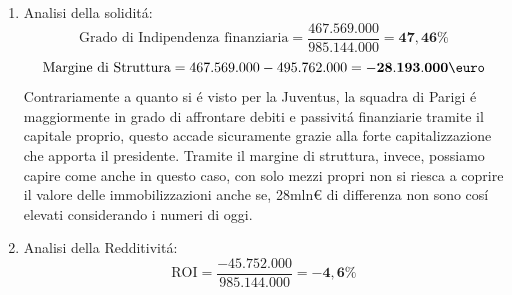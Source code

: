 \documentclass[
    corpo=12pt,
    oneside,
    evenboxes,
    tipotesi=triennale,
    stile=classica,
    oldstyle,
    autoretitolo,
    greek,
]{toptesi}
\begin{document}
\begin{interlinea}{1.5}
\begin{enumerate}
\begin{figure}
            \label{sp_psg}  
        \end{figure}
        \begin{equation}
                \text{Margine di Tesoreria} = 74.346.000-246.032.000 = \mathbf{-171.786.000\mbox{\euro}}
            \label{eqn: marg_teso_psg}
        \end{equation}
        \begin{equation}
                \text{Indice di liquidit\'a primaria} = \frac{74.346.000}{246.032.000} = \mathbf{30,21\%}
            \label{eqn: ind_liq_psg}
        \end{equation}
       Anche in questo caso non si presenta una situazione positiva: l'equazione \ref{eqn: marg_teso_psg} mostra come anche in questo caso il 
       risultato sia negativo, anche se in valore minore. Questo probabilmente perch\'e il PSG possedendo una quantit\'a elevatissima di risorse
       liquide e immediate, riesce comunque a tenere sotto controllo le passivit\'a a breve termine.
    \item Analisi della solidit\'a:\newline
        \begin{equation}
            \text{Grado di Indipendenza finanziaria} = \frac{467.569.000}{985.144.000} = \mathbf{47,46\%}
        \label{eqn: indeb_psg}
        \end{equation}
        \begin{equation}
            \text{Margine di Struttura} = 467.569.000-495.762.000 = \mathbf{-28.193.000\mbox{\euro}}
            \label{eqn: marg_strutt_psg}
        \end{equation}
        Contrariamente a quanto si \'e visto per la Juventus, la squadra di Parigi \'e maggiormente in grado di affrontare
        debiti e passivit\'a finanziarie tramite il capitale proprio, questo accade sicuramente grazie alla forte capitalizzazione
        che apporta il presidente. Tramite il margine di struttura, invece, possiamo capire come anche in questo caso, con solo mezzi propri non si riesca a coprire il valore
        delle immobilizzazioni anche se, 28mln€ di differenza non sono cos\'i elevati considerando i numeri di oggi.
    \item Analisi della Redditivit\'a:\newline
        \begin{equation}
            \text{ROI} = \frac{-45.752.000}{985.144.000} = \mathbf{-4,6\%}
        \label{eqn: roi_psg}
        \end{equation}
        \begin{equation}

\end{equation}
\end{enumerate}
\end{interlinea}
\end{document}
